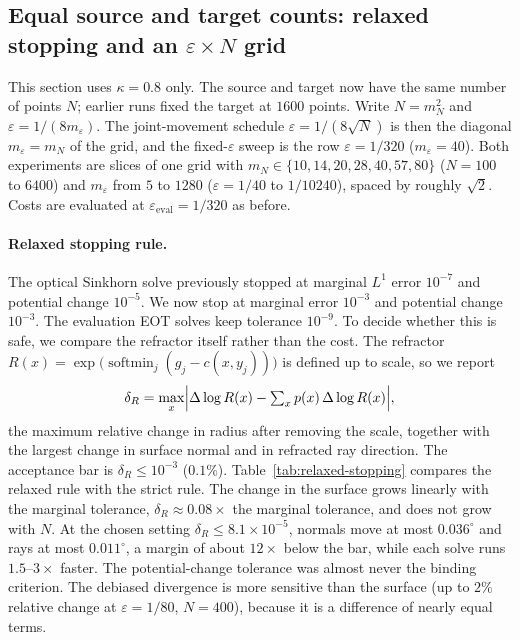 \clearpage
\subsection{Equal source and target counts: relaxed stopping and an
$\varepsilon\times N$ grid}
\label{sec:equal-count-grid}
This section uses $\kappa=0.8$ only. The source and target now have the
same number of points $N$; earlier runs fixed the target at $1600$ points.
Write $N=m_N^2$ and $\varepsilon=1/(8m_\varepsilon)$. The joint-movement
schedule $\varepsilon=1/(8\sqrt N)$ is then the diagonal $m_\varepsilon=m_N$
of the grid, and the fixed-$\varepsilon$ sweep is the row
$\varepsilon=1/320$ ($m_\varepsilon=40$). Both experiments are slices of
one grid with $m_N\in\{10,14,20,28,40,57,80\}$ ($N=100$ to $6400$) and
$m_\varepsilon$ from $5$ to $1280$ ($\varepsilon=1/40$ to $1/10240$),
spaced by roughly $\sqrt2$. Costs are evaluated at
$\varepsilon_{\mathrm{eval}}=1/320$ as before.

\paragraph{Relaxed stopping rule.}
The optical Sinkhorn solve previously stopped at marginal $L^1$ error
$10^{-7}$ and potential change $10^{-5}$. We now stop at marginal error
$10^{-3}$ and potential change $10^{-3}$. The evaluation EOT solves keep
tolerance $10^{-9}$. To decide whether this is safe, we compare the
refractor itself rather than the cost. The refractor
$R(x)=\exp\bigl(\operatorname{softmin}_j(g_j-c(x,y_j))\bigr)$ is defined up
to scale, so we report
\[
 \delta_R=\max_x\Bigl|\Delta\log R(x)-\textstyle\sum_x p(x)\,\Delta\log R(x)\Bigr|,
\]
the maximum relative change in radius after removing the scale, together
with the largest change in surface normal and in refracted ray direction.
The acceptance bar is $\delta_R\le 10^{-3}$ ($0.1\%$).
Table~\ref{tab:relaxed-stopping} compares the relaxed rule with the strict
rule. The change in the surface grows linearly with the marginal tolerance,
$\delta_R\approx0.08\times$ the marginal tolerance, and does not grow with
$N$. At the chosen setting $\delta_R\le8.1\times10^{-5}$, normals move at
most $0.036^\circ$ and rays at most $0.011^\circ$, a margin of about
$12\times$ below the bar, while each solve runs $1.5$--$3\times$ faster.
The potential-change tolerance was almost never the binding criterion.
The debiased divergence is more sensitive than the surface
(up to $2\%$ relative change at $\varepsilon=1/80$, $N=400$), because it is
a difference of nearly equal terms.

